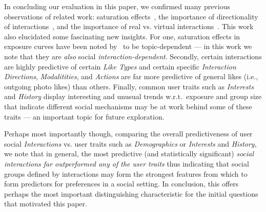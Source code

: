 In concluding our evaluation in this paper, we 
confirmed many previous observations of related work: saturation
effects~\cite{Romero2011hashtag}, the importance of directionality of
interactions~\cite{saez2011high}, and the importance of real
vs. virtual interactions~\cite{brandtzag2011facebook}.  This work also
elucidated some fascinating new insights.  For one, 
saturation effects in exposure curves have been noted
by~\cite{Romero2011hashtag} to be topic-dependent --- in this work
we note that they are \emph{also} social 
\emph{interaction-dependent}.  Secondly, certain interactions are
highly predictive of certain \textit{Like Types} and certain specific
\emph{Interaction Directions}, \emph{Modalitities}, and \emph{Actions}
are far more predictive of general likes (i.e., outgoing photo likes)
than others.  Finally, common user traits such as \emph{Interests} and
\emph{History} display interesting and unusual trends w.r.t.\ exposure
and group size that indicate different social mechanisms may be at
work behind some of these traits --- an important topic for future
exploration.

Perhaps most importantly though, comparing the overall predictiveness
of user social \textit{Interactions} vs. user traits such as
\textit{Demographics} or \textit{Interests} and \textit{History}, we
note that in general, the most predictive (and statistically
significant) \emph{social interactions far outperformed any of the
user traits} thus indicating that social groups defined by
interactions may form the strongest features from which to form
predictors for preferences in a social setting.  In conclusion, this
offers perhaps the most important distinguishing characteristic for
the initial questions that motivated this paper.
